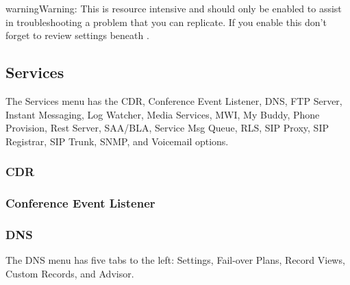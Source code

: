 \documentclass[letterpaper,10pt,english]{sphinxmanual}
\begin{document}
\begin{sphinxadmonition}{warning}{Warning:}
This is resource intensive and should only be enabled to assist in troubleshooting a problem that you can replicate. If you enable this don’t forget to review settings beneath {\hyperref[\detokenize{webui:diagnostics-network-packet-capture}]{}}.
\end{sphinxadmonition}



\subsection{Services}
\label{\detokenize{webui:services}}\label{\detokenize{webui:services-menu}}
The Services menu has the CDR, Conference Event Listener, DNS, FTP Server, Instant Messaging, Log Watcher, Media Services, MWI, My Buddy, Phone Provision, Rest Server, SAA/BLA, Service Msg Queue, RLS, SIP Proxy, SIP Registrar, SIP Trunk, SNMP, and Voicemail options.


\subsubsection{CDR}
\label{\detokenize{webui:cdr}}\label{\detokenize{webui:cdr-service}}\begin{quote}

\end{quote}


\subsubsection{Conference Event Listener}
\label{\detokenize{webui:conference-event-listener}}\label{\detokenize{webui:conference-event}}\begin{quote}

\end{quote}


\subsubsection{DNS}
\label{\detokenize{webui:dns}}\label{\detokenize{webui:id33}}
The DNS menu has five tabs to the left: Settings, Fail-over Plans, Record Views, Custom Records, and Advisor.
\end{document}
